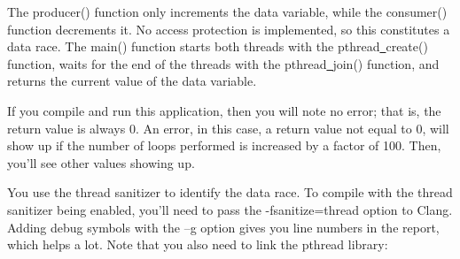 The producer() function only increments the data variable, while the consumer() function decrements it. No access protection is implemented, so this constitutes a data race. The main() function starts both threads with the pthread\underline{~}create() function, waits for the end of the threads with the pthread\underline{~}join() function, and returns the current value of the data variable.\par

If you compile and run this application, then you will note no error; that is, the return value is always 0. An error, in this case, a return value not equal to 0, will show up if the number of loops performed is increased by a factor of 100. Then, you'll see other values showing up.\par

You use the thread sanitizer to identify the data race. To compile with the thread sanitizer being enabled, you'll need to pass the -fsanitize=thread option to Clang. Adding debug symbols with the –g option gives you line numbers in the report, which helps a lot. Note that you also need to link the pthread library:\par

